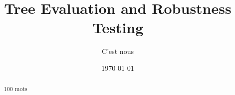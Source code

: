 \documentclass[a4paper,12pt]{article}
\title{Tree Evaluation and Robustness Testing}
\author{C'est nous}
\begin{document}

\date{\today}
\maketitle

\begin{abstract}
100 mots
\end{abstract}

\tableofcontents







% 





\end{document}
